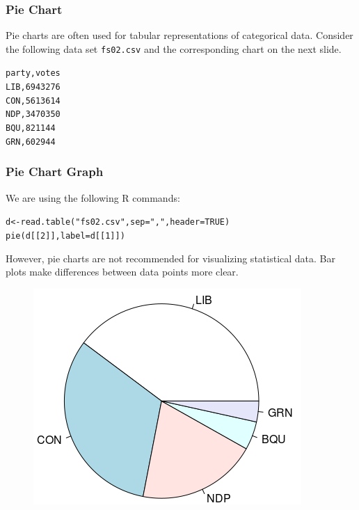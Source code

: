 \documentclass[xcolor=dvipsnames]{beamer}
\begin{document}
\begin{frame}
  \frametitle{Pie Chart}
Pie charts are often used for tabular representations of categorical
data. Consider the following data set \texttt{fs02.csv} and the
corresponding chart on the next slide.
\begin{alltt}
\small
party,votes\newline
LIB,6943276\newline
CON,5613614\newline
NDP,3470350\newline
BQU,821144\newline
GRN,602944
\end{alltt}
\end{frame}

\begin{frame}
  \frametitle{Pie Chart Graph}
We are using the following R commands: 
\begin{alltt}
\small
d<-read.table("fs02.csv",sep=",",header=TRUE)\newline
pie(d[[2]],label=d[[1]])
\end{alltt}

However, pie charts are not recommended for visualizing statistical
data. Bar plots make differences between data points more clear.
\begin{figure}[h]
\includegraphics[scale=.5]{./diagrams/pie.png}
\end{figure}
\end{frame}
\end{document}
